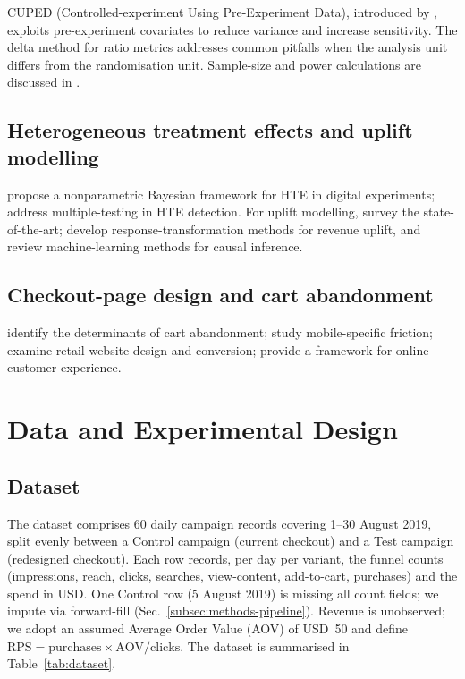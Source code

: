 \documentclass[pdflatex,sn-mathphys-num]{sn-jnl}
\theoremstyle{thmstyleone}
\theoremstyle{thmstyletwo}
\theoremstyle{thmstylethree}
\begin{document}
CUPED (Controlled-experiment Using Pre-Experiment Data),
introduced by \cite{deng2013improving}, exploits pre-experiment covariates to reduce
variance and increase sensitivity. The delta method for ratio metrics
\cite{deng2018applying} addresses common pitfalls when the analysis unit
differs from the randomisation unit. Sample-size and power calculations are
discussed in \cite{wan2023sample}.

\subsection{Heterogeneous treatment effects and uplift modelling}\label{subsec:hte}

\cite{taddy2016nonparametric} propose a nonparametric Bayesian framework
for HTE in digital experiments; \cite{yu2018false} address multiple-testing in HTE detection.
For uplift modelling, \cite{devriendt2018literature} survey the state-of-the-art;
\cite{gubela2020response} develop response-transformation methods for revenue uplift,
and \cite{athey2019machine} review machine-learning methods for causal inference.

\subsection{Checkout-page design and cart abandonment}\label{subsec:checkout}

\cite{kukar2010determinants} identify the determinants of cart abandonment;
\cite{huang2018mobile} study mobile-specific friction;
\cite{mcdowell2016retail} examine retail-website design and conversion;
\cite{bleier2019creating} provide a framework for online customer experience.

\section{Data and Experimental Design}\label{sec:data}

\subsection{Dataset}\label{subsec:dataset}

The dataset comprises 60 daily campaign records covering 1--30 August 2019,
split evenly between a Control campaign (current checkout) and a Test campaign
(redesigned checkout). Each row records, per day per variant,
the funnel counts (impressions, reach, clicks, searches, view-content, add-to-cart, purchases)
and the spend in USD. One Control row (5 August 2019) is missing all count fields;
we impute via forward-fill (Sec.~\ref{subsec:methods-pipeline}).
Revenue is unobserved; we adopt an assumed Average Order Value (AOV) of USD~50
and define $\text{RPS}=\text{purchases}\times\text{AOV}/\text{clicks}$.
The dataset is summarised in Table~\ref{tab:dataset}.
\end{document}
